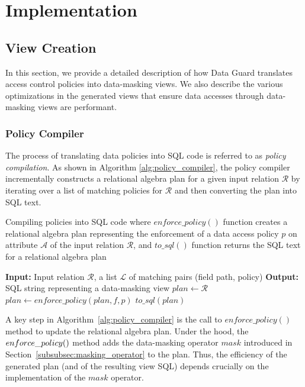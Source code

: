 \section{Implementation} \label{sec:impl}
\subsection{View Creation}
In this section, we provide a detailed description of how Data Guard translates access control policies into data-masking views. We also describe the various optimizations in the generated views that ensure data accesses through data-masking views are performant. 

\subsubsection{Policy Compiler} \label{subsubsec:pc}
The process of translating data policies into SQL code is referred to as {\em policy compilation}. As shown in Algorithm \ref{alg:policy_compiler}, the policy compiler incrementally constructs a relational algebra plan for a given input relation $\mathcal{R}$ by iterating over a list of matching policies for $\mathcal{R}$ and then converting the plan into SQL text. 
\begin{algorithm}
    \caption{Compiling policies into SQL code where $enforce\_policy()$ function creates a relational algebra plan representing the enforcement of a data access policy $p$ 
    on attribute $\mathcal{A}$ of the input relation $\mathcal{R}$, and $to\_sql()$ function returns the SQL text for a relational algebra plan}
    \label{alg:policy_compiler}
    \begin{algorithmic}
        \STATE \textbf{Input:} Input relation $\mathcal{R}$, a list $\mathcal{L}$ of matching pairs (field path, policy)
        \STATE \textbf{Output:} SQL string representing a data-masking view
	    \STATE $plan \gets \mathcal{R}$
            	\STATE $plan \gets enforce\_policy(plan, f, p)$
        	\ENDFOR
        \RETURN $to\_sql(plan)$
    \end{algorithmic}
\end{algorithm}

A key step in Algorithm~\ref{alg:policy_compiler} is the call to $enforce\_policy()$ method to update the relational algebra plan. Under the hood, the $enforce\_ \\policy()$ method adds the data-masking operator $mask$ introduced in Section~\ref{subsubsec:masking_operator} to the plan. Thus, the efficiency of the generated plan (and of the resulting view SQL) depends crucially on the implementation of the $mask$ operator. 

